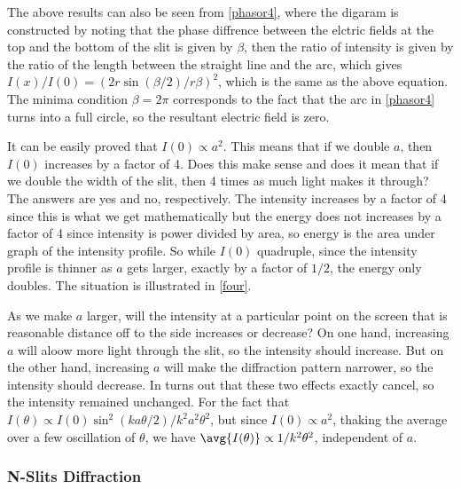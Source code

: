 \documentclass[english,a4paper,12pt]{report}
\begin{document}
The above results can also be seen from \cref{phasor4}, where the digaram is constructed by noting that the phase diffrence between the elctric fields at the top and the bottom of the slit is given by \(\beta \), then the ratio of intensity is given by the ratio of the length between the straight line and the arc, which gives \(I(x) / I(0) = (2r \sin (\beta /2) /r \beta )^2\), which is the same as the above equation. The minima condition \(\beta = 2\pi \) corresponds to the fact that the arc in \cref{phasor4} turns into a full circle, so the resultant electric field is zero. 


{It can be easily proved that \(I(0) \propto a^2\). This means that if we double \(a\), then \(I(0)\) increases by a factor of 4. Does this make sense and does it mean that if we double the width of the slit, then 4 times as much light makes it through?}
{The answers are yes and no, respectively. The intensity increases by a factor of 4 since this is what we get mathematically but the energy does not increases by a factor of 4 since intensity is power divided by area, so energy is the area under graph of the intensity profile. So while \(I(0)\) quadruple, since the intensity profile is thinner as \(a\) gets larger, exactly by a factor of \(1/2\), the energy only doubles. The situation is illustrated in \cref{four}.}

{As we make \(a\) larger, will the intensity at a particular point on the screen that is reasonable distance off to the side increases or decrease?}
{On one hand, increasing \(a\) will aloow more light through the slit, so the intensity should increase. But on the other hand, increasing \(a\) will make the diffraction pattern narrower, so the intensity should decrease. In turns out that these two effects exactly cancel, so the intensity remained unchanged. For the fact that \(I(\theta) \propto I(0)\sin ^2(ka \theta /2) /k^2a^2\theta ^2 \), but since \(I(0)\propto a^2\), thaking the average over a few oscillation of \(\theta \), we have \(\avg{I(\theta )} \propto 1 /k^2\theta ^2 \), independent of \(a\).    } 

\subsubsection{N-Slits Diffraction}
\end{document}

